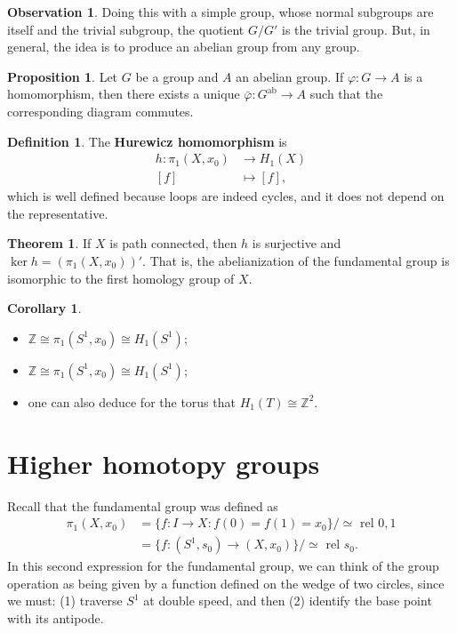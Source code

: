 \documentclass{book}
\theoremstyle{definition}
\newtheorem*{defn}{Definition}
\newtheorem*{obs}{Observation}
\newtheorem*{teo}{Theorem}
\newtheorem*{prop}{Proposition}
\newtheorem*{coro}{Corollary}
\newcommand{\Z}{\mathbb{Z}}
\begin{document}
\begin{obs}
Doing this with a simple group, whose normal subgroups are
itself and the trivial subgroup, the quotient $G/G'$ is the
trivial group. But, in general, the idea is to produce an
abelian group from any group.
\end{obs}

\begin{prop}
Let $G$ be a group and $A$ an abelian group. If
$\varphi:G\to A$ is a homomorphism, then there exists a
unique $\bar\varphi:G^{\text{ab}}\to A$ such that the
corresponding diagram commutes.
\end{prop}

\begin{defn}
The \textbf{Hurewicz homomorphism} is
$$
\begin{aligned}
h:\pi_1(X,x_0)&\to H_1(X)\\
[f]&\mapsto [f],
\end{aligned}
$$
which is well defined because loops are indeed cycles, and it
does not depend on the representative.
\end{defn}

\begin{teo}
If $X$ is path connected, then $h$ is surjective and
$\ker h=(\pi_1(X,x_0))'$. That is, the abelianization of the
fundamental group is isomorphic to the first homology group
of $X$.
\end{teo}

\begin{coro}\leavevmode
\begin{itemize}
\item $\Z\cong\pi_1(S^1,x_0)\cong H_1(S^1)$;
\item $\Z\cong\pi_1(S^1,x_0)\cong H_1(S^1)$;
\item one can also deduce for the torus that
$H_1(T)\cong\Z^2$.
\end{itemize}
\end{coro}

\section{Higher homotopy groups}

Recall that the fundamental group was defined as
$$
\begin{aligned}
\pi_1(X,x_0)
&=\{f:I\to X:f(0)=f(1)=x_0\}
\Big/\simeq\text{ rel }0,1\\
&=\{f:(S^1,s_0)\to(X,x_0)\}
\Big/\simeq\text{ rel }s_0.
\end{aligned}
$$
In this second expression for the fundamental group, we can
think of the group operation as being given by a function
defined on the wedge of two circles, since we must:
(1) traverse $S^1$ at double speed, and then (2) identify the
base point with its antipode.
\end{document}
